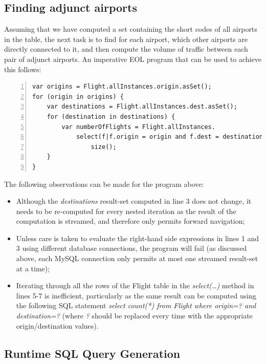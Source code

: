 \subsection{Finding adjunct airports}

Assuming that we have computed a set containing the short codes of all airports in the table, the next task is to find for each airport, which other airports are directly connected to it, and then compute the volume of traffic between each pair of adjunct airports. An imperative EOL program that can be used to achieve this follows:

\begin{lstlisting}[language=EOL, numbers=left]
var origins = Flight.allInstances.origin.asSet();
for (origin in origins) {
	var destinations = Flight.allInstances.dest.asSet();
	for (destination in destinations) {
		var numberOfFlights = Flight.allInstances.
			select(f|f.origin = origin and f.dest = destination).
				size();
	}
}
\end{lstlisting}

The following observations can be made for the program above:

\begin{itemize}
  \item Although the \emph{destinations} result-set computed in line 3 does not change, it needs to be re-computed for every nested iteration as the result of the computation is streamed, and therefore only permits forward navigation;
  \item Unless care is taken to evaluate the right-hand side expressions in lines 1 and 3 using different database connections, the program will fail (as discussed above, each MySQL connection only permits at most one streamed result-set at a time);
  \item Iterating through all the rows of the Flight table in the \emph{select(\ldots)} method in lines 5-7 is inefficient, particularly as the same result can be computed using the following SQL statement \emph{select count(*) from Flight where origin=? and destination=?} (where \emph{?} should be replaced every time with the appropriate origin/destination values).
\end{itemize}

\subsection{Runtime SQL Query Generation}


